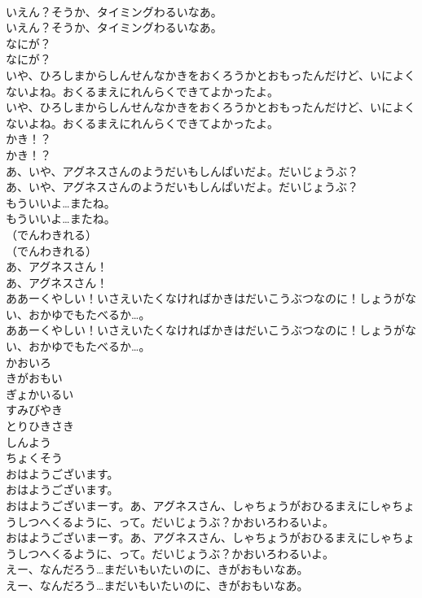 \documentclass[8pt]{extreport}
\begin{document}
\begin{CJK}{UTF8}{min}
\\	いえん？そうか、タイミングわるいなあ。
\\	いえん？そうか、タイミングわるいなあ。
\\	なにが？
\\	なにが？
\\	いや、ひろしまからしんせんなかきをおくろうかとおもったんだけど、いによくないよね。おくるまえにれんらくできてよかったよ。
\\	いや、ひろしまからしんせんなかきをおくろうかとおもったんだけど、いによくないよね。おくるまえにれんらくできてよかったよ。
\\	かき！？
\\	かき！？
\\	あ、いや、アグネスさんのようだいもしんぱいだよ。だいじょうぶ？
\\	あ、いや、アグネスさんのようだいもしんぱいだよ。だいじょうぶ？
\\	もういいよ…またね。
\\	もういいよ…またね。
\\	（でんわきれる）
\\	（でんわきれる）
\\	あ、アグネスさん！
\\	あ、アグネスさん！
\\	ああーくやしい！いさえいたくなければかきはだいこうぶつなのに！しょうがない、おかゆでもたべるか…。
\\	ああーくやしい！いさえいたくなければかきはだいこうぶつなのに！しょうがない、おかゆでもたべるか…。
\\	かおいろ
\\	きがおもい
\\	ぎょかいるい
\\	すみびやき
\\	とりひきさき
\\	しんよう
\\	ちょくそう
\\	おはようございます。
\\	おはようございます。
\\	おはようございまーす。あ、アグネスさん、しゃちょうがおひるまえにしゃちょうしつへくるように、って。だいじょうぶ？かおいろわるいよ。
\\	おはようございまーす。あ、アグネスさん、しゃちょうがおひるまえにしゃちょうしつへくるように、って。だいじょうぶ？かおいろわるいよ。
\\	えー、なんだろう…まだいもいたいのに、きがおもいなあ。
\\	えー、なんだろう…まだいもいたいのに、きがおもいなあ。

\end{CJK}
\end{document}
